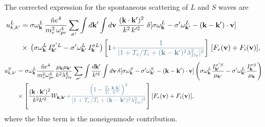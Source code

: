 \documentclass[12pt,a4paper,ruledheader]{report}
\begin{document}
The corrected expression for the spontaneous scattering of
$L$ and $S$ waves are 
\begin{equation}
  \label{corrL}
  \begin{split}
  u_{k,k'}^{L}&=\sigma\omega_{\bf k}^L\,\frac{\hat n e^4}{m_e^2\,\omega_{pe}^4}
\sum_{\sigma '}\int d{\bf k'}\int d{\bf v}\;
\frac{({\bf k}\cdot{\bf k}')^2}{k^2\,k'^2}\;\delta[\sigma\omega_{\bf k}^L
-\sigma '\omega_{{\bf k}'}^L-({\bf k}-{\bf k}')\cdot{\bf v}]\\
&\times\,\bigl(\sigma\omega_{\bf k}^L\,I_{{\bf k}'}^{\sigma 'L}
  -\sigma '\omega_{{\bf k}'}^L\, I_{\bf k}^{\sigma L}\bigr)
  \left[1\textcolor{darkblue}{
  + \frac{1}{|1+T_e/T_i+({\bf k-k'})^2 \lambda_{De}^2|^2}} \right]
  \,[F_e({\bf v})+F_i({\bf v})],
\end{split}
\end{equation}
\begin{equation}
  \label{corrS}
  \begin{split}
  u_{k,k'}^{S}&=\sigma\omega_{\bf k}^L\frac{\hat n e^4}{m_e^2\omega_{pe}^4}
  \frac{\mu_{\bf k}\mu_{{\bf k}'}}{k^2\lambda_{De}^4}\sum_{\sigma '}
  \int \frac{d{\bf k'}}{k'^2}
  \int d{\bf v}\,\delta[ \sigma\omega_{\bf k}^S-\sigma '\omega_{{\bf k}'}^S
  -({\bf k}-{\bf k}')\cdot{\bf v}]
  \left(\sigma\omega_{\bf k}^L\frac{I_{{\bf k}'}^{\sigma 'S}}{\mu_{{\bf k}'}}
  -\sigma '\omega_{{\bf k}'}^L\frac{I_{\bf k}^{\sigma S}}{\mu_{\bf k}}\right)\\
&\times\left[\frac{({\bf k}\cdot{\bf k}')^2}{k^2k'^2}W_{{\bf k},{\bf k}'}
  \textcolor{darkblue}{
    +\frac{\left(1-\frac{T_e}{T_i} \frac{\bf k \cdot k'}{k'^2}\right)^2}
        {|1+T_e/T_i+({\bf k-k'})^2 \lambda_{De}^2|^2}}\right]
[F_e({\bf v})+F_i({\bf v})],
\end{split}
\end{equation}
where the blue term is the noneigenmode contribution.
\end{document}
